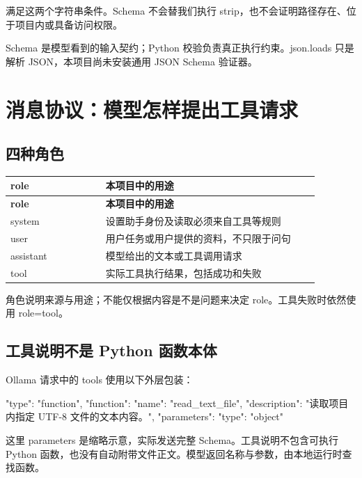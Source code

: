  满足这两个字符串条件。Schema 不会替我们执行 strip，也不会证明路径存在、位于项目内或具备访问权限。

Schema 是模型看到的输入契约；Python 校验负责真正执行约束。json.loads 只是解析 JSON，本项目尚未安装通用 JSON Schema 验证器。

\section{消息协议：模型怎样提出工具请求}

\subsection{四种角色}

{\small\setlength{\tabcolsep}{4pt}
\renewcommand{\arraystretch}{1.25}
\begin{longtable}{>{\raggedright\arraybackslash}p{0.28\linewidth}>{\raggedright\arraybackslash}p{0.63\linewidth}}
\toprule
\textbf{role} & \textbf{本项目中的用途} \\
\midrule\endfirsthead
\toprule
\textbf{role} & \textbf{本项目中的用途} \\
\midrule\endhead
\bottomrule\endfoot
system & 设置助手身份及读取必须来自工具等规则 \\
user & 用户任务或用户提供的资料，不只限于问句 \\
assistant & 模型给出的文本或工具调用请求 \\
tool & 实际工具执行结果，包括成功和失败 \\
\end{longtable}}

角色说明来源与用途；不能仅根据内容是不是问题来决定 role。工具失败时依然使用 role=tool。

\subsection{工具说明不是 Python 函数本体}

Ollama 请求中的 tools 使用以下外层包装：

\begin{Code}
{
  "type": "function",
  "function": {
    "name": "read_text_file",
    "description": "读取项目内指定 UTF-8 文件的文本内容。",
    "parameters": {"type": "object"}
  }
}
\end{Code}

这里 parameters 是缩略示意，实际发送完整 Schema。工具说明不包含可执行 Python 函数，也没有自动附带文件正文。模型返回名称与参数，由本地运行时查找函数。

